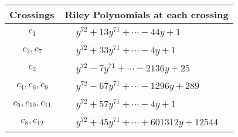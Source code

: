 \documentclass[1p]{elsarticle_modified}
\theoremstyle{definition}
\begin{document}
\begin{tabular}{m{50pt}|m{274pt}}
Crossings & \hspace{64pt}Riley Polynomials at each crossing \\
\hline $$\begin{aligned}c_{1}\end{aligned}$$&$\begin{aligned}
&y^{72}+13 y^{71}+\cdots-44 y+1
\end{aligned}$\\
\hline $$\begin{aligned}c_{2},c_{7}\end{aligned}$$&$\begin{aligned}
&y^{72}+33 y^{71}+\cdots-4 y+1
\end{aligned}$\\
\hline $$\begin{aligned}c_{3}\end{aligned}$$&$\begin{aligned}
&y^{72}-7 y^{71}+\cdots-2136 y+25
\end{aligned}$\\
\hline $$\begin{aligned}c_{4},c_{6},c_{9}\end{aligned}$$&$\begin{aligned}
&y^{72}-67 y^{71}+\cdots-1296 y+289
\end{aligned}$\\
\hline $$\begin{aligned}c_{5},c_{10},c_{11}\end{aligned}$$&$\begin{aligned}
&y^{72}+57 y^{71}+\cdots-4 y+1
\end{aligned}$\\
\hline $$\begin{aligned}c_{8},c_{12}\end{aligned}$$&$\begin{aligned}
&y^{72}+45 y^{71}+\cdots+601312 y+12544
\end{aligned}$\\
\hline
\end{tabular}
\vskip 2pc
\end{document}
